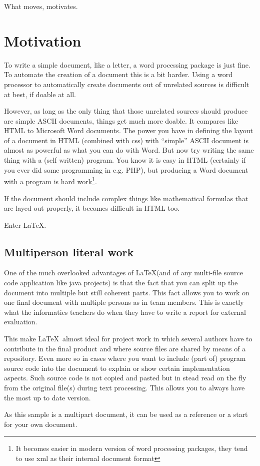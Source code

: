 \renewcommand\TheFile{ch02_motivates.tex}

\begin{savequote}[15cm]
  \raggedleft
  \sffamily
  What moves, motivates.
\end{savequote}
\chapter{Motivation}
To write a simple document, like a letter, a word processing package 
is just fine.
To automate the creation of a document this is a bit harder. 
Using a word processor to automatically create documents out of 
unrelated sources is difficult at best, if doable at all.

However, as long as the only thing that those unrelated sources should
produce are simple ASCII documents, things get much more
doable. It compares like HTML to Microsoft Word documents. The power
you have in defining the layout of a document in HTML (combined with
css) with ``simple'' ASCII document is almost as powerful as what you
can do with Word. But now try writing the same thing with a (self
written) program. You know it is easy in HTML (certainly if you ever
did some programming in e.g. PHP), but producing a Word document with
a program is hard work\footnote{It becomes easier in modern version of
word processing packages, they tend to use xml as their internal document format}. 

If the document should include complex things like mathematical
formulas that are layed out properly, it becomes difficult in HTML too.

Enter \LaTeX.

\section{Multiperson literal work}
One of the much overlooked advantages of \LaTeX (and of any multi-file
source code application like java projects) is that the fact that you
can split up the document into multiple but still coherent parts.
This fact allows you to work on one final document with multiple
persons as in team members. This is exactly what the informatics teachers do when they have
to write a report for external evaluation.

This make \LaTeX\ almost ideal for project work in which several
authors have to contribute in the final product and where source files
are shared by means of a repository. Even more so in
cases where you want to include (part of) program source code
into the document to explain or show certain implementation
aspects. Such source code is not copied and pasted but in stead read
on the fly from the original file(s) during text processing. This
allows you to always have the most up to date version.

As this sample is a multipart document, it can be used as a reference
or a start for your own document.

